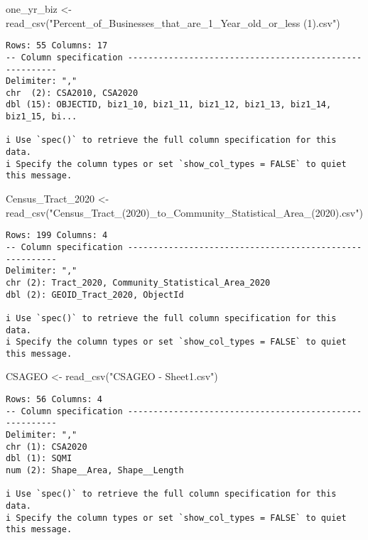 \documentclass[
  letterpaper,
  DIV=11,
  numbers=noendperiod]{scrartcl}
\newenvironment{Shaded}{\begin{snugshade}}{\end{snugshade}}
\newcommand{\FunctionTok}[1]{\textcolor[rgb]{0.28,0.35,0.67}{#1}}
\newcommand{\NormalTok}[1]{\textcolor[rgb]{0.00,0.23,0.31}{#1}}
\newcommand{\OtherTok}[1]{\textcolor[rgb]{0.00,0.23,0.31}{#1}}
\newcommand{\StringTok}[1]{\textcolor[rgb]{0.13,0.47,0.30}{#1}}
\begin{document}
\begin{Shaded}
\begin{Highlighting}[]
\NormalTok{one\_yr\_biz }\OtherTok{\textless{}{-}} \FunctionTok{read\_csv}\NormalTok{(}\StringTok{"Percent\_of\_Businesses\_that\_are\_1\_Year\_old\_or\_less (1).csv"}\NormalTok{)}
\end{Highlighting}
\end{Shaded}

\begin{verbatim}
Rows: 55 Columns: 17
-- Column specification --------------------------------------------------------
Delimiter: ","
chr  (2): CSA2010, CSA2020
dbl (15): OBJECTID, biz1_10, biz1_11, biz1_12, biz1_13, biz1_14, biz1_15, bi...

i Use `spec()` to retrieve the full column specification for this data.
i Specify the column types or set `show_col_types = FALSE` to quiet this message.
\end{verbatim}

\begin{Shaded}
\begin{Highlighting}[]
\NormalTok{Census\_Tract\_2020 }\OtherTok{\textless{}{-}} \FunctionTok{read\_csv}\NormalTok{(}\StringTok{"Census\_Tract\_(2020)\_to\_Community\_Statistical\_Area\_(2020).csv"}\NormalTok{)}
\end{Highlighting}
\end{Shaded}

\begin{verbatim}
Rows: 199 Columns: 4
-- Column specification --------------------------------------------------------
Delimiter: ","
chr (2): Tract_2020, Community_Statistical_Area_2020
dbl (2): GEOID_Tract_2020, ObjectId

i Use `spec()` to retrieve the full column specification for this data.
i Specify the column types or set `show_col_types = FALSE` to quiet this message.
\end{verbatim}

\begin{Shaded}
\begin{Highlighting}[]
\NormalTok{CSAGEO }\OtherTok{\textless{}{-}} \FunctionTok{read\_csv}\NormalTok{(}\StringTok{"CSAGEO {-} Sheet1.csv"}\NormalTok{)}
\end{Highlighting}
\end{Shaded}

\begin{verbatim}
Rows: 56 Columns: 4
-- Column specification --------------------------------------------------------
Delimiter: ","
chr (1): CSA2020
dbl (1): SQMI
num (2): Shape__Area, Shape__Length

i Use `spec()` to retrieve the full column specification for this data.
i Specify the column types or set `show_col_types = FALSE` to quiet this message.
\end{verbatim}
\end{document}
